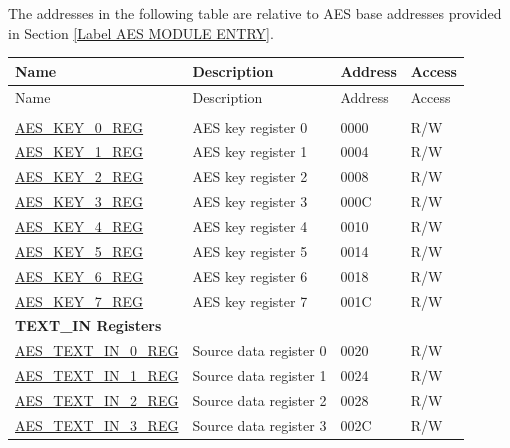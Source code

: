 

The addresses in the following table are relative to AES base addresses provided in Section \ref{Label AES MODULE ENTRY}.

\begin{longtable}{ | p{5.2cm} | p{6.6cm} | p{2cm} | p{1.2cm} | }
\hline\rowcolor{lightgray}
Name & Description &  Address & Access \\ \hline
\endfirsthead
        \hline
        \rowcolor{lightgray}
       Name & Description &  Address & Access  \\
        \hline
        \endhead
        \endfoot

\multicolumn{4}{|l|}{\textbf{Key Registers}} \\ \hline

\hyperref[regdesc:AESKEYnREG]{AES\_KEY\_0\_REG}				&	AES key register 0				& \hexprefix{}0000 & R/W \\ \hline
\hyperref[regdesc:AESKEYnREG]{AES\_KEY\_1\_REG}				&	AES key register 1				& \hexprefix{}0004 & R/W \\ \hline
\hyperref[regdesc:AESKEYnREG]{AES\_KEY\_2\_REG}				&	AES key register 2				& \hexprefix{}0008 & R/W \\ \hline
\hyperref[regdesc:AESKEYnREG]{AES\_KEY\_3\_REG}				&	AES key register 3				& \hexprefix{}000C & R/W \\ \hline
\hyperref[regdesc:AESKEYnREG]{AES\_KEY\_4\_REG}				&	AES key register 4				& \hexprefix{}0010 & R/W \\ \hline
\hyperref[regdesc:AESKEYnREG]{AES\_KEY\_5\_REG}				&	AES key register 5				& \hexprefix{}0014 & R/W \\ \hline
\hyperref[regdesc:AESKEYnREG]{AES\_KEY\_6\_REG}				&	AES key register 6				& \hexprefix{}0018 & R/W \\ \hline
\hyperref[regdesc:AESKEYnREG]{AES\_KEY\_7\_REG}				&	AES key register 7				& \hexprefix{}001C & R/W \\ \hline

\multicolumn{4}{|l|}{\textbf{TEXT\_IN Registers}} \\ \hline

\hyperref[regdesc:AESTEXTINnREG]{AES\_TEXT\_IN\_0\_REG}			&	Source data register 0					& \hexprefix{}0020 & R/W \\ \hline
\hyperref[regdesc:AESTEXTINnREG]{AES\_TEXT\_IN\_1\_REG}			&	Source data register 1					& \hexprefix{}0024 & R/W \\ \hline
\hyperref[regdesc:AESTEXTINnREG]{AES\_TEXT\_IN\_2\_REG}			&	Source data register 2					& \hexprefix{}0028 & R/W \\ \hline
\hyperref[regdesc:AESTEXTINnREG]{AES\_TEXT\_IN\_3\_REG}			&	Source data register 3					& \hexprefix{}002C & R/W \\ \hline


\end{longtable}
